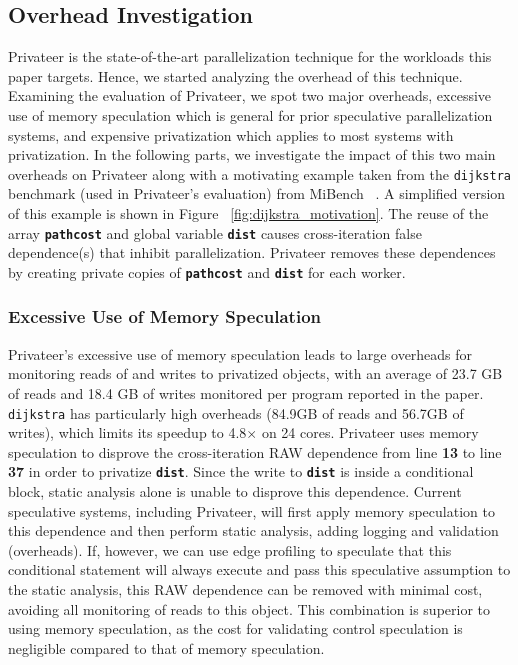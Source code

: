 \subsection{Overhead Investigation}
Privateer is the state-of-the-art parallelization technique for the
workloads this paper targets. Hence, we started analyzing the overhead of
this technique.
%
Examining the evaluation of Privateer, we spot two major overheads,
excessive use of memory speculation which is general for prior speculative
parallelization systems, and expensive privatization which applies to
most systems with privatization.
%
In the following parts, we investigate the impact of this two main
overheads on Privateer along with a motivating example taken from the
\texttt{dijkstra} benchmark (used in Privateer's evaluation) from MiBench
~\cite{}. A simplified version of this example is shown in Figure
~\ref{fig:dijkstra_motivation}. The reuse of the array
\texttt{\textbf{pathcost}} and global variable \texttt{\textbf{dist}}
causes cross-iteration false dependence(s) that inhibit parallelization.
Privateer removes these dependences by creating private copies of
\texttt{\textbf{pathcost}} and \texttt{\textbf{dist}} for each worker.

\subsubsection{Excessive Use of Memory Speculation}
Privateer's excessive use of memory speculation leads to large overheads
for monitoring reads of and writes to privatized objects, with an average
of 23.7 GB of reads and 18.4 GB of writes monitored per program reported in
the paper. \texttt{dijkstra} has particularly high overheads (84.9GB of
reads and 56.7GB of writes), which limits its speedup to 4.8$\times$ on 24
cores. Privateer uses memory speculation to disprove the cross-iteration
RAW dependence from line \textbf{13} to line \textbf{37} in order to
privatize \texttt{\textbf{dist}}. Since the write to \texttt{\textbf{dist}}
is inside a conditional block, static analysis alone is unable to disprove
this dependence. Current speculative systems, including Privateer, will
first apply memory speculation to this dependence and then perform static
analysis, adding logging and validation (overheads). If, however, we can
use edge profiling to speculate that this conditional statement will always
execute and pass this speculative assumption to the static analysis, this
RAW dependence can be removed with minimal cost, avoiding all monitoring of
reads to this object. This combination is superior to using memory
speculation, as the cost for validating control speculation is negligible
compared to that of memory speculation.

